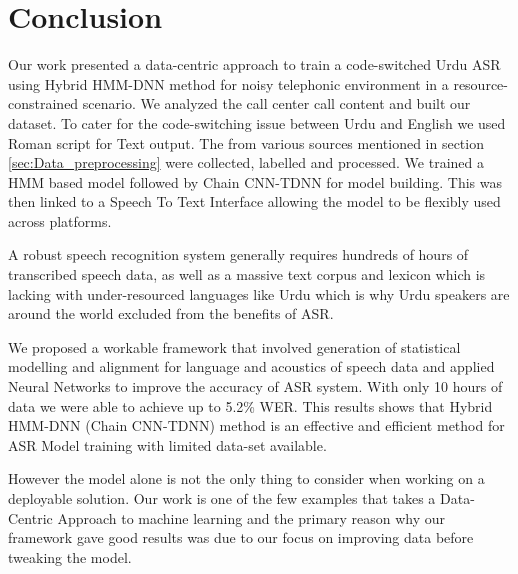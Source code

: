 \documentclass{article}
\begin{document}
\section{Conclusion} %
\label{cha:discussion_conclusion}
Our work presented a data-centric approach to train a code-switched Urdu ASR using Hybrid HMM-DNN method for noisy telephonic environment in a resource-constrained scenario. We analyzed the call center call content and built our dataset. To cater for the code-switching issue between Urdu and English we used Roman script for Text output. The from various sources mentioned in section \ref{sec:Data_preprocessing} were collected, labelled and processed. We trained a HMM based model followed by Chain CNN-TDNN for model building. This was then linked to a Speech To Text Interface allowing the model to be flexibly used across platforms.


A robust speech recognition system generally requires hundreds of hours of transcribed speech data, as well as a massive text corpus and lexicon which is lacking with under-resourced languages like Urdu which is why Urdu speakers are around the world excluded from the benefits of ASR.

We proposed a workable framework that involved generation of statistical modelling and alignment for language and acoustics of speech data and applied Neural Networks to improve the accuracy of ASR system. With only 10 hours of data we were able to achieve up to 5.2\% WER. This results shows that Hybrid HMM-DNN (Chain CNN-TDNN) method is an effective and efficient method for ASR Model training with limited data-set available. 

However the model alone is not the only thing to consider when working on a deployable solution. Our work is one of the few examples that takes a Data-Centric Approach to machine learning and the primary reason why our framework gave good results was due to our focus on improving data before tweaking the model.
\end{document}

